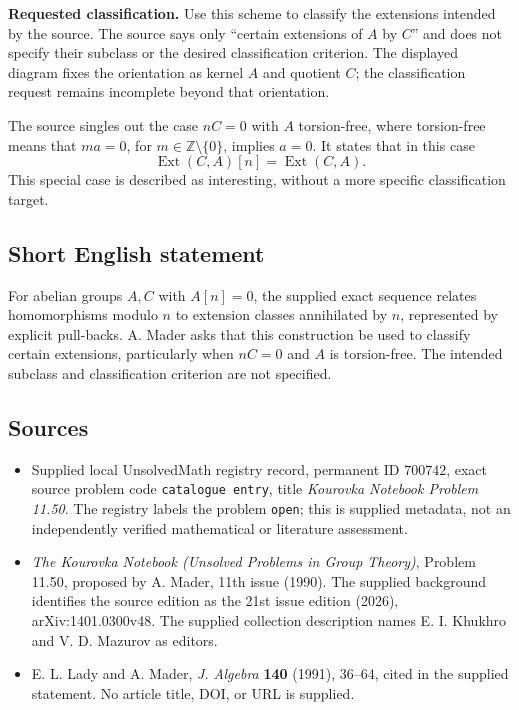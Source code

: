 \documentclass[11pt]{article}
\begin{document}
\textbf{Requested classification.} Use this scheme to classify the extensions intended by the source. The source says only ``certain extensions of \(A\) by \(C\)'' and does not specify their subclass or the desired classification criterion. The displayed diagram fixes the orientation as kernel \(A\) and quotient \(C\); the classification request remains incomplete beyond that orientation.

The source singles out the case \(nC=0\) with \(A\) torsion-free, where torsion-free means that \(ma=0\), for \(m\in\mathbb Z\setminus\{0\}\), implies \(a=0\). It states that in this case
\[
\operatorname{Ext}(C,A)[n]=\operatorname{Ext}(C,A).
\]
This special case is described as interesting, without a more specific classification target.
\subsection{Short English statement}
For abelian groups \(A,C\) with \(A[n]=0\), the supplied exact sequence relates homomorphisms modulo \(n\) to extension classes annihilated by \(n\), represented by explicit pull-backs. A. Mader asks that this construction be used to classify certain extensions, particularly when \(nC=0\) and \(A\) is torsion-free. The intended subclass and classification criterion are not specified.
\subsection{Sources}
\begin{itemize}
\item Supplied local UnsolvedMath registry record, permanent ID \(700742\), exact source problem code \texttt{catalogue entry}, title \emph{Kourovka Notebook Problem 11.50}. The registry labels the problem \texttt{open}; this is supplied metadata, not an independently verified mathematical or literature assessment.
\item \emph{The Kourovka Notebook (Unsolved Problems in Group Theory)}, Problem 11.50, proposed by A. Mader, 11th issue (1990). The supplied background identifies the source edition as the 21st issue edition (2026), arXiv:1401.0300v48. The supplied collection description names E. I. Khukhro and V. D. Mazurov as editors.
\item E. L. Lady and A. Mader, \emph{J. Algebra} \textbf{140} (1991), 36--64, cited in the supplied statement. No article title, DOI, or URL is supplied.
\end{itemize}
\end{document}
